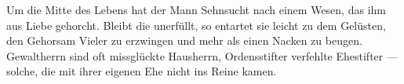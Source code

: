Um die Mitte des Lebens hat der Mann Sehnsucht nach einem Wesen, das ihm aus Liebe gehorcht. Bleibt die unerfüllt, so entartet sie leicht zu dem Gelüsten, den Gehorsam Vieler zu erzwingen und mehr als einen Nacken zu beugen. Gewaltherrn sind oft missglückte Hausherrn, Ordensstifter verfehlte Ehestifter — solche, die mit ihrer eigenen Ehe nicht ins Reine kamen.
\par

